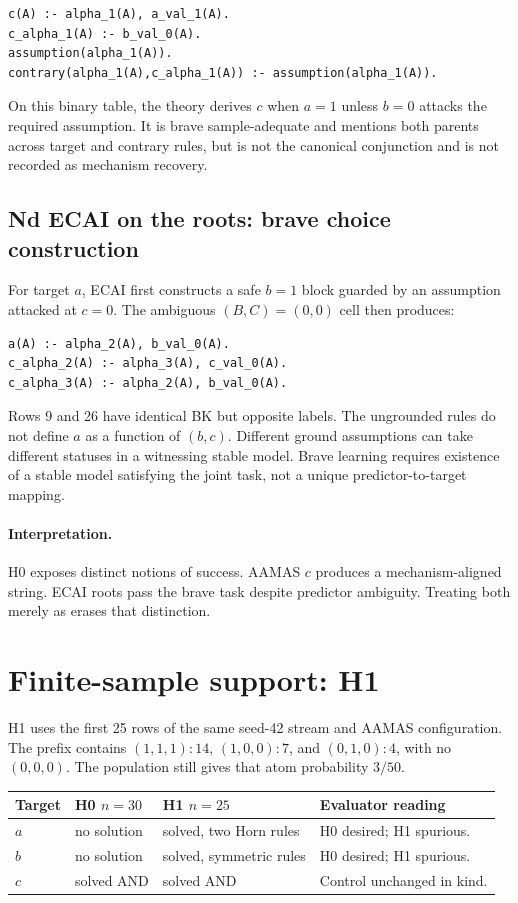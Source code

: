 \documentclass[11pt]{article}
\DeclareRobustCommand{\code}[1]{\texttt{\detokenize{#1}}}
\newcommand{\interpretation}{\paragraph{Interpretation.}}
\begin{document}
\begin{lstlisting}
c(A) :- alpha_1(A), a_val_1(A).
c_alpha_1(A) :- b_val_0(A).
assumption(alpha_1(A)).
contrary(alpha_1(A),c_alpha_1(A)) :- assumption(alpha_1(A)).
\end{lstlisting}

On this binary table, the theory derives \(c\) when \(a=1\) unless \(b=0\)
attacks the required assumption. It is brave sample-adequate and mentions both
parents across target and contrary rules, but is not the canonical conjunction
and is not recorded as mechanism recovery.

\subsection{Nd ECAI on the roots: brave choice construction}

For target \(a\), ECAI first constructs a safe \(b=1\) block guarded by an
assumption attacked at \(c=0\). The ambiguous \((B,C)=(0,0)\) cell then
produces:

\begin{lstlisting}
a(A) :- alpha_2(A), b_val_0(A).
c_alpha_2(A) :- alpha_3(A), c_val_0(A).
c_alpha_3(A) :- alpha_2(A), b_val_0(A).
\end{lstlisting}

Rows 9 and 26 have identical BK but opposite labels. The ungrounded rules do
not define \(a\) as a function of \((b,c)\). Different ground assumptions can
take different statuses in a witnessing stable model. Brave learning requires
existence of a stable model satisfying the joint task, not a unique
predictor-to-target mapping.

\interpretation
H0 exposes distinct notions of success. AAMAS \(c\) produces a
mechanism-aligned string. ECAI roots pass the brave task despite predictor
ambiguity. Treating both merely as \code{solved} erases that distinction.

\section{Finite-sample support: H1}

H1 uses the first 25 rows of the same seed-42 stream and AAMAS configuration.
The prefix contains \((1,1,1):14\), \((1,0,0):7\), and \((0,1,0):4\), with no
\((0,0,0)\). The population still gives that atom probability \(3/50\).

\begin{center}
\begin{tabularx}{\textwidth}{
  >{\raggedright\arraybackslash}p{}
  >{\raggedright\arraybackslash}p{}
  >{\raggedright\arraybackslash}p{}X}
\toprule
Target & H0 \(n=30\) & H1 \(n=25\) & Evaluator reading \\
\midrule
\(a\) & no solution & solved, two Horn rules & H0 desired; H1 spurious. \\
\(b\) & no solution & solved, symmetric rules & H0 desired; H1 spurious. \\
\(c\) & solved AND & solved AND & Control unchanged in kind. \\
\bottomrule
\end{tabularx}
\end{center}
\end{document}
